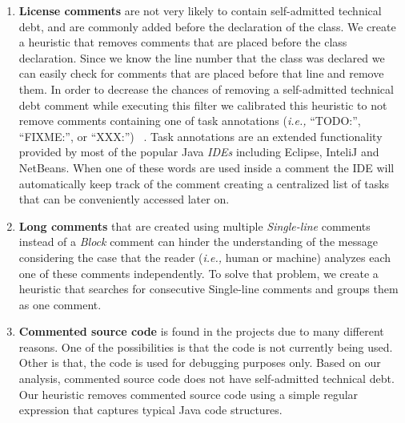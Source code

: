 \begin{enumerate}
\item \textbf{License comments} are not very likely to contain self-admitted technical debt, and are commonly added before the declaration of the class. We create a heuristic that removes comments that are placed before the class declaration. Since we know the line number that the class was declared we can easily check for comments that are placed before that line and remove them. In order to decrease the chances of removing a self-admitted technical debt comment while executing this filter we calibrated this heuristic to not remove comments containing one of task annotations (\textit{i.e.,} ``TODO:'', ``FIXME:'', or ``XXX:'') ~\cite{Storey2008ICSE}. Task annotations are an extended functionality provided by most of the popular Java \textit{IDEs} including Eclipse, InteliJ and NetBeans. When one of these words are used inside a comment the IDE will automatically keep track of the comment creating a centralized list of tasks that can be conveniently accessed later on. 

\item \textbf{Long comments} that are created using multiple \emph{Single-line} comments instead of a \emph{Block} comment can hinder the understanding of the message considering the case that the reader (\textit{i.e.,} human or machine) analyzes each one of these comments independently. To solve that problem, we create a heuristic that searches for consecutive Single-line comments and groups them as one  comment.

\item \textbf{Commented source code} is found in the projects due to many different reasons. One of the possibilities is that the code is not currently being used. Other is that, the code is used for debugging purposes only. Based on our analysis, commented source code does not have self-admitted technical debt. Our heuristic removes commented source code using a simple regular expression that captures typical Java code structures.


\end{enumerate}
